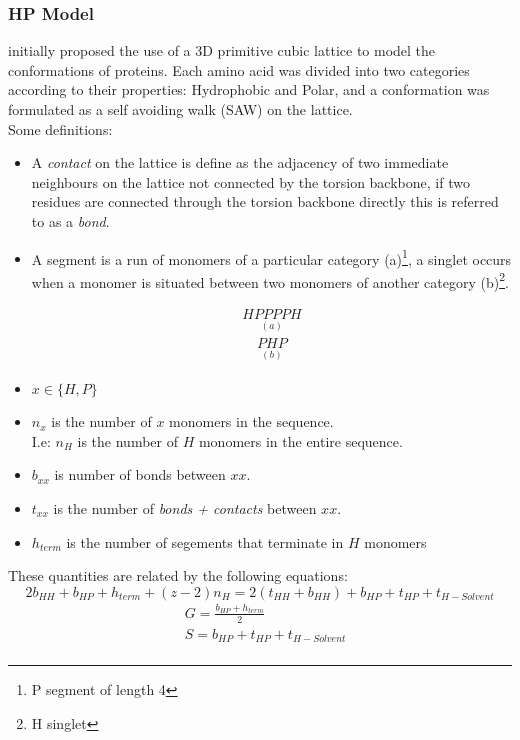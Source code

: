 \subsubsection{HP Model}
\cite{Yue} initially proposed the use of a 3D primitive cubic lattice to model the conformations
of proteins. Each amino acid was divided into two categories according to their properties:
Hydrophobic and Polar, and a conformation was formulated as a self avoiding walk (SAW) on the lattice.
\\ Some definitions:
\begin{itemize}
    \item A \emph{contact} on the lattice is define as the adjacency of two immediate neighbours on the lattice
    not connected by the torsion backbone, if two residues are connected 
    through the torsion backbone directly this is referred to 
    as a \emph{bond}.
    \item A segment is a run of monomers of a particular category (a)\footnote{P segment of length 4}, a singlet
          occurs when a monomer is situated between two monomers of another category (b)\footnote{H singlet}.

    \begin{multicols}{2}
        \noindent
        \begin{align*}
            \underset{(a)}{HPPPPH} 
        \end{align*}
        \begin{align*}
            \underset{(b)}{PHP}
        \end{align*}
    \end{multicols}
    \item $x \in \{H,P\}$
    \item $n_x$ is the number of $x$ monomers in the sequence. \\
        I.e: $n_H$ is the number of $H$ monomers in the entire sequence.
    \item $b_{xx}$ is number of bonds between $xx$.
    \item $t_{xx}$ is the number of \emph{bonds + contacts} between $xx$.
    \item $h_{term}$ is the number of segements that terminate in $H$ monomers
\end{itemize}
These quantities are related by the following equations:
\begin{equation}
    2b_{HH} + b_{HP} + h_{term} + (z-2)n_H = 2(t_{HH} + b_{HH}) + b_{HP} + t_{HP} + t_{H-Solvent}
\end{equation}
\begin{equation}
    \begin{split}
        & G = \frac{b_{HP} + h_{term}}{2} \\
        & S = b_{HP} + t_{HP} + t_{H-Solvent} \\
    \end{split}
\end{equation}
